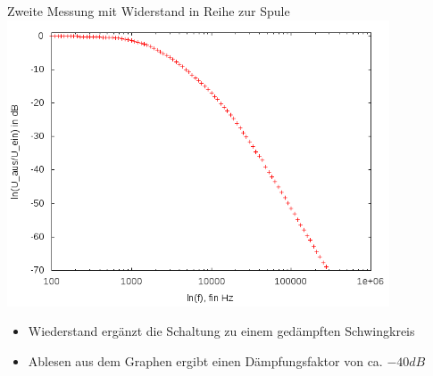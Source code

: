 \documentclass[compress,11pt]{beamer}
\begin{document}
\begin{frame}
\begin{block}{Zweite Messung mit Widerstand in Reihe zur Spule}
\centering
\includegraphics[width=0.85\textwidth]{../daten/Messdaten/plots/Aufgabe4Bodediagramm_tief_R_gain}
\end{block}
\end{frame}
\begin{frame}
\begin{itemize}
\item Wiederstand ergänzt die Schaltung zu einem gedämpften Schwingkreis
\item Ablesen aus dem Graphen ergibt einen Dämpfungsfaktor von ca. $-40 dB$
\end{itemize}
\end{frame}
\end{document}
